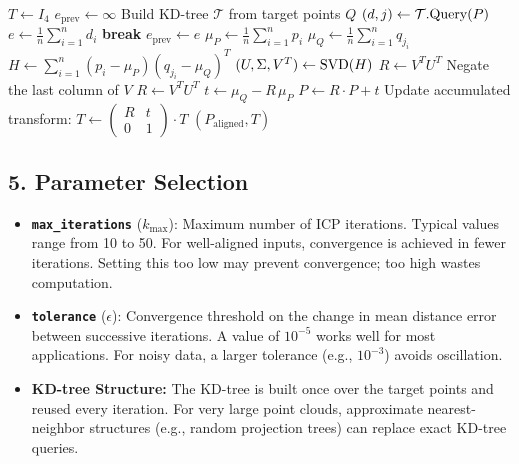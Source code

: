 \begin{algorithm}
\caption{Iterative Closest Point (ICP) Registration}
\label{alg:icp}
\begin{algorithmic}[1]
    \State $T \leftarrow I_4$ 
    \State $e_{\text{prev}} \leftarrow \infty$
    \State Build KD-tree $\mathcal{T}$ from target points $Q$
        \State $(d, j) \leftarrow \mathcal{T}.\textnormal{Query}(P)$ 
        \State $e \leftarrow \frac{1}{n}\sum_{i=1}^{n} d_i$ 
            \State \textbf{break}
        \EndIf
        \State $e_{\text{prev}} \leftarrow e$
        \State $\mu_P \leftarrow \frac{1}{n}\sum_{i=1}^{n} p_i$
        \State $\mu_Q \leftarrow \frac{1}{n}\sum_{i=1}^{n} q_{j_i}$
        \State $H \leftarrow \sum_{i=1}^{n} (p_i - \mu_P)(q_{j_i} - \mu_Q)^T$
        \State $(U, \Sigma, V^T) \leftarrow \textnormal{SVD}(H)$
        \State $R \leftarrow V^T U^T$
            \State Negate the last column of $V$
            \State $R \leftarrow V^T U^T$
        \EndIf
        \State $t \leftarrow \mu_Q - R \, \mu_P$
        \State $P \leftarrow R \cdot P + t$ 
        \State Update accumulated transform: $T \leftarrow \begin{pmatrix} R & t \\ 0 & 1 \end{pmatrix} \cdot T$
    \EndFor
    \State \Return $(P_{\text{aligned}}, T)$
\EndFunction
\end{algorithmic}
\end{algorithm}

\subsection{5. Parameter Selection}

\begin{itemize}
    \item \textbf{\texttt{max\_iterations}} ($k_{\max}$): Maximum number of ICP iterations. Typical values range from 10 to 50. For well-aligned inputs, convergence is achieved in fewer iterations. Setting this too low may prevent convergence; too high wastes computation.
    \item \textbf{\texttt{tolerance}} ($\epsilon$): Convergence threshold on the change in mean distance error between successive iterations. A value of $10^{-5}$ works well for most applications. For noisy data, a larger tolerance (e.g., $10^{-3}$) avoids oscillation.
    \item \textbf{KD-tree Structure:} The KD-tree is built once over the target points and reused every iteration. For very large point clouds, approximate nearest-neighbor structures (e.g., random projection trees) can replace exact KD-tree queries.
\end{itemize}

